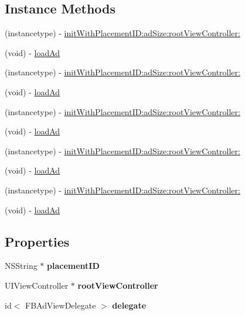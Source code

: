 \subsection*{Instance Methods}
\begin{DoxyCompactItemize}
\item 
(instancetype) -\/ \hyperlink{interfaceFBAdView_a13c5a5c0d93dd525a3c55a01a0d9766e}{init\+With\+Placement\+I\+D\+:ad\+Size\+:root\+View\+Controller\+:}
\item 
(void) -\/ \hyperlink{interfaceFBAdView_acb5962ac98e3645dd53893d98d5b9564}{load\+Ad}
\item 
(instancetype) -\/ \hyperlink{interfaceFBAdView_a13c5a5c0d93dd525a3c55a01a0d9766e}{init\+With\+Placement\+I\+D\+:ad\+Size\+:root\+View\+Controller\+:}
\item 
(void) -\/ \hyperlink{interfaceFBAdView_acb5962ac98e3645dd53893d98d5b9564}{load\+Ad}
\item 
(instancetype) -\/ \hyperlink{interfaceFBAdView_a13c5a5c0d93dd525a3c55a01a0d9766e}{init\+With\+Placement\+I\+D\+:ad\+Size\+:root\+View\+Controller\+:}
\item 
(void) -\/ \hyperlink{interfaceFBAdView_acb5962ac98e3645dd53893d98d5b9564}{load\+Ad}
\item 
(instancetype) -\/ \hyperlink{interfaceFBAdView_a13c5a5c0d93dd525a3c55a01a0d9766e}{init\+With\+Placement\+I\+D\+:ad\+Size\+:root\+View\+Controller\+:}
\item 
(void) -\/ \hyperlink{interfaceFBAdView_acb5962ac98e3645dd53893d98d5b9564}{load\+Ad}
\item 
(instancetype) -\/ \hyperlink{interfaceFBAdView_a13c5a5c0d93dd525a3c55a01a0d9766e}{init\+With\+Placement\+I\+D\+:ad\+Size\+:root\+View\+Controller\+:}
\item 
(void) -\/ \hyperlink{interfaceFBAdView_acb5962ac98e3645dd53893d98d5b9564}{load\+Ad}
\end{DoxyCompactItemize}
\subsection*{Properties}
\begin{DoxyCompactItemize}
\item 
\mbox{\label{interfaceFBAdView_ae620876f21183986739cc13682c31ba1}} 
N\+S\+String $\ast$ {\bfseries placement\+ID}
\item 
\mbox{\label{interfaceFBAdView_a92248564fd7d0ffcf50259cb8f55044d}} 
U\+I\+View\+Controller $\ast$ {\bfseries root\+View\+Controller}
\item 
\mbox{\label{interfaceFBAdView_a928ddc39c743b306b84c3ee978e56d64}} 
id$<$ F\+B\+Ad\+View\+Delegate $>$ {\bfseries delegate}
\end{DoxyCompactItemize}


